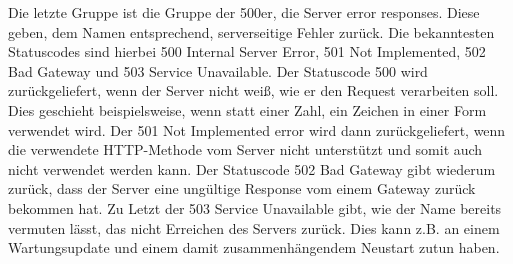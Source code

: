 Die letzte Gruppe ist die Gruppe der 500er, die Server error responses. Diese geben, dem Namen entsprechend, serverseitige Fehler zurück. Die bekanntesten Statuscodes sind hierbei 500 Internal Server Error, 501 Not Implemented, 502 Bad Gateway und 503 Service Unavailable. Der Statuscode 500 wird zurückgeliefert, wenn der Server nicht weiß, wie er den Request verarbeiten soll. Dies geschieht beispielsweise, wenn statt einer Zahl, ein Zeichen in einer Form verwendet wird. Der 501 Not Implemented error wird dann zurückgeliefert, wenn die verwendete HTTP-Methode vom Server nicht unterstützt und somit auch nicht verwendet werden kann. Der Statuscode 502 Bad Gateway gibt wiederum zurück, dass der Server eine ungültige Response vom einem Gateway zurück bekommen hat. Zu Letzt der 503 Service Unavailable gibt, wie der Name bereits vermuten lässt, das nicht Erreichen des Servers zurück. Dies kann z.B. an einem Wartungsupdate und einem damit zusammenhängendem Neustart zutun haben.